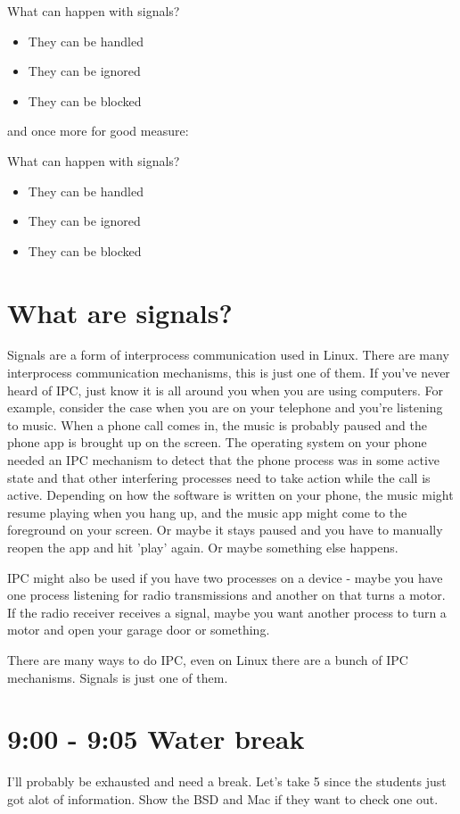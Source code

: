 \documentclass[8pt]{article}
\begin{document}
What can happen with signals?

\begin{itemize}
\item They can be handled
\item They can be ignored
\item They can be blocked
\end{itemize}

and once more for good measure:

What can happen with signals?

\begin{itemize}
\item They can be handled
\item They can be ignored
\item They can be blocked
\end{itemize}

\section{What are signals?}
Signals are a form of interprocess communication used in Linux. There are many interprocess communication mechanisms, this is just one of them. If you've never heard of IPC, just know it is all around you when you are using computers. For example, consider the case when you are on your telephone and you're listening to music. When a phone call comes in, the music is probably paused and the phone app is brought up on the screen. The operating system on your phone needed an IPC mechanism to detect that the phone process was in some active state and that other interfering processes need to take action while the call is active. Depending on how the software is written on your phone, the music might resume playing when you hang up, and the music app might come to the foreground on your screen. Or maybe it stays paused and you have to manually reopen the app and hit 'play' again. Or maybe something else happens.

IPC might also be used if you have two processes on a device - maybe you have one process listening for radio transmissions and another on that turns a motor. If the radio receiver receives a signal, maybe you want another process to turn a motor and open your garage door or something.

There are many ways to do IPC, even on Linux there are a bunch of IPC mechanisms. Signals is just one of them.

\section{9:00 - 9:05 Water break}
I'll probably be exhausted and need a break. Let's take 5 since the students
just got alot of information. Show the BSD and Mac if they want to check one
out.
\end{document}
